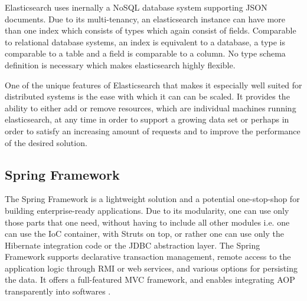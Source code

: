 Elasticsearch uses  inernally a \ac{NoSQL} database system supporting \ac{JSON} documents. Due to its multi-tenancy, an elasticsearch instance can have more than one index which consists of types which again consist of fields. Comparable to relational database systems, an index is equivalent to a database, a type is comparable to a table and a field is comparable to a column. No type schema definition is necessary which makes elasticsearch highly flexible.

One of the unique features of Elasticsearch that makes it especially well suited for distributed systems is the ease with which it can  can be scaled. It provides the ability to either add or remove resources, which are individual machines running elasticsearch, at any time in order to support a growing data set or perhaps in order to satisfy an increasing amount of requests and to improve the performance of the desired solution.


\subsection{Spring Framework\label{sec:back_sp_fr}}
The Spring Framework is a lightweight solution and a potential one-stop-shop for building 
enterprise-ready applications. Due to its modularity, one can use only those parts that
one need, without having to include all other modules i.e. one can use the IoC container, with Struts on top, or rather one
can use only the Hibernate integration code or the \ac{JDBC} abstraction layer. The Spring Framework
supports declarative transaction management, remote access to the application logic through \ac{RMI} or web services,
and various options for persisting the data. It offers a full-featured \ac{MVC} framework, and enables integrating \ac{AOP} transparently into  softwares \cite{spring-framework-reference}.



